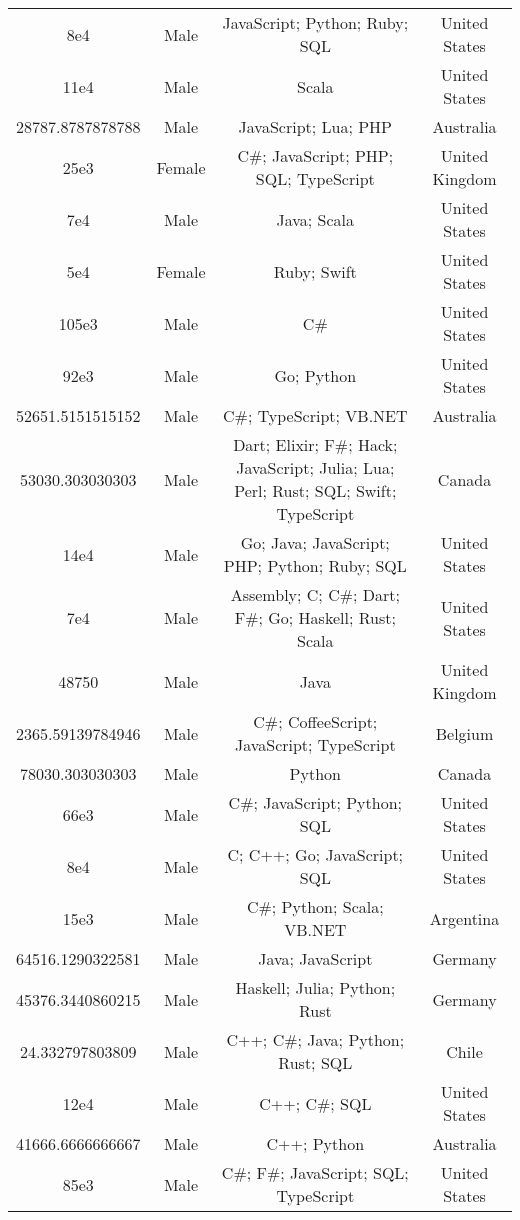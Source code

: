 \begin{center}
\begin{tabular}{ |c|c|c|c| }
8e4  &  Male  &  JavaScript; Python; Ruby; SQL  &  United States  \\ 
11e4  &  Male  &  Scala  &  United States  \\ 
28787.8787878788  &  Male  &  JavaScript; Lua; PHP  &  Australia  \\ 
25e3  &  Female  &  C\#; JavaScript; PHP; SQL; TypeScript  &  United Kingdom  \\ 
7e4  &  Male  &  Java; Scala  &  United States  \\ 
5e4  &  Female  &  Ruby; Swift  &  United States  \\ 
105e3  &  Male  &  C\#  &  United States  \\ 
92e3  &  Male  &  Go; Python  &  United States  \\ 
52651.5151515152  &  Male  &  C\#; TypeScript; VB.NET  &  Australia  \\ 
53030.303030303  &  Male  &  Dart; Elixir; F\#; Hack; JavaScript; Julia; Lua; Perl; Rust; SQL; Swift; TypeScript  &  Canada  \\ 
14e4  &  Male  &  Go; Java; JavaScript; PHP; Python; Ruby; SQL  &  United States  \\ 
7e4  &  Male  &  Assembly; C; C\#; Dart; F\#; Go; Haskell; Rust; Scala  &  United States  \\ 
48750  &  Male  &  Java  &  United Kingdom  \\ 
2365.59139784946  &  Male  &  C\#; CoffeeScript; JavaScript; TypeScript  &  Belgium  \\ 
78030.303030303  &  Male  &  Python  &  Canada  \\ 
66e3  &  Male  &  C\#; JavaScript; Python; SQL  &  United States  \\ 
8e4  &  Male  &  C; C++; Go; JavaScript; SQL  &  United States  \\ 
15e3  &  Male  &  C\#; Python; Scala; VB.NET  &  Argentina  \\ 
64516.1290322581  &  Male  &  Java; JavaScript  &  Germany  \\ 
45376.3440860215  &  Male  &  Haskell; Julia; Python; Rust  &  Germany  \\ 
24.332797803809  &  Male  &  C++; C\#; Java; Python; Rust; SQL  &  Chile  \\ 
12e4  &  Male  &  C++; C\#; SQL  &  United States  \\ 
41666.6666666667  &  Male  &  C++; Python  &  Australia  \\ 
85e3  &  Male  &  C\#; F\#; JavaScript; SQL; TypeScript  &  United States  \\ 

\end{tabular}
\end{center}
